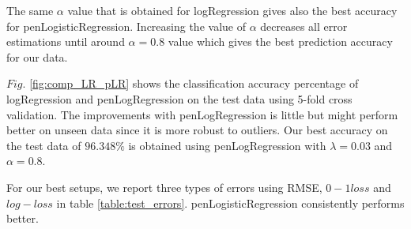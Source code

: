 The same $\alpha$ value that is obtained for logRegression gives also the best accuracy for penLogisticRegression. Increasing the value of $\alpha$ decreases all error estimations until around $\alpha=0.8$ value which gives the best prediction accuracy for our data.

$Fig.$ \ref{fig:comp_LR_pLR} shows the classification accuracy percentage of logRegression and penLogRegression on the test data using 5-fold cross validation. The improvements with penLogRegression is little but might perform better on unseen data since it is more robust to outliers. Our best accuracy on the test data of $96.348\%$  is obtained using penLogRegression with $\lambda=0.03$ and $\alpha=0.8$. 

For our best setups, we report three types of errors using RMSE, $0-1 loss$ and $log-loss$  in table \ref{table:test_errors}. penLogisticRegression consistently performs better.


